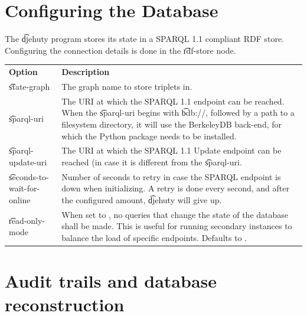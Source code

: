 \section{Configuring the Database}

  The \t{djehuty} program stores its state in a SPARQL 1.1 compliant
  RDF store.  Configuring the connection details is done in the
  \t{rdf-store} node.

\begin{tabularx}{\textwidth}{*{1}{!{\VRule[-1pt]}l}!{\VRule[-1pt]}X}
  \headrow
  \textbf{Option}            & \textbf{Description}\\
  \t{state-graph}            & The graph name to store triplets in.\\
  \t{sparql-uri}             & The URI at which the SPARQL 1.1 endpoint can
                               be reached.\newline\newline
                               When the \t{sparql-uri} begins with \t{bdb://},
                               followed by a path to a filesystem directory,
                               it will use the BerkeleyDB back-end, for which
                               the  Python package needs to
                               be installed.\\
  \t{sparql-update-uri}      & The URI at which the SPARQL 1.1 Update endpoint
                               can be reached (in case it is different from
                               the \t{sparql-uri}.\\
  \t{seconds-to-wait-for-online} & Number of seconds to retry in case the SPARQL
                               endpoint is down when initializing. A retry is
                               done every second, and after the configured
                                   amount, \t{djehuty} will give up.\\
  \t{read-only-mode}         & When set to , no queries that change
                               the state of the database shall be made.  This
                               is useful for running secondary instances to
                               balance the load of specific endpoints. Defaults
                               to .
\end{tabularx}

\section{Audit trails and database reconstruction}

